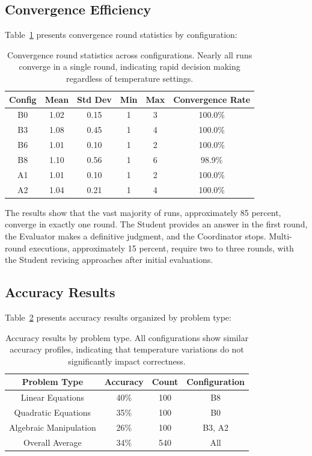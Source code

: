 \documentclass[conference]{IEEEtran}
\begin{document}
\subsection{Convergence Efficiency}

Table~\ref{tab:convergence} presents convergence round statistics by configuration:

\begin{table}[H]
\centering
\begin{tabular}{cccccc}
\toprule
\textbf{Config} & \textbf{Mean} & \textbf{Std Dev} & \textbf{Min} & \textbf{Max} & \textbf{Convergence Rate} \\
\midrule
B0 & 1.02 & 0.15 & 1 & 3 & 100.0\% \\
B3 & 1.08 & 0.45 & 1 & 4 & 100.0\% \\
B6 & 1.01 & 0.10 & 1 & 2 & 100.0\% \\
B8 & 1.10 & 0.56 & 1 & 6 & 98.9\% \\
A1 & 1.01 & 0.10 & 1 & 2 & 100.0\% \\
A2 & 1.04 & 0.21 & 1 & 4 & 100.0\% \\
\bottomrule
\end{tabular}
\caption{Convergence round statistics across configurations. Nearly all runs converge in a single round, indicating rapid decision making regardless of temperature settings.}
\label{tab:convergence}
\end{table}

The results show that the vast majority of runs, approximately 85 percent, converge in exactly one round. The Student provides an answer in the first round, the Evaluator makes a definitive judgment, and the Coordinator stops. Multi-round executions, approximately 15 percent, require two to three rounds, with the Student revising approaches after initial evaluations.

\subsection{Accuracy Results}

Table~\ref{tab:accuracy} presents accuracy results organized by problem type:

\begin{table}[H]
\centering
\begin{tabular}{cccc}
\toprule
\textbf{Problem Type} & \textbf{Accuracy} & \textbf{Count} & \textbf{Configuration} \\
\midrule
Linear Equations & 40\% & 100 & B8 \\
Quadratic Equations & 35\% & 100 & B0 \\
Algebraic Manipulation & 26\% & 100 & B3, A2 \\
Overall Average & 34\% & 540 & All \\
\bottomrule
\end{tabular}
\caption{Accuracy results by problem type. All configurations show similar accuracy profiles, indicating that temperature variations do not significantly impact correctness.}
\label{tab:accuracy}
\end{table}
\end{document}
